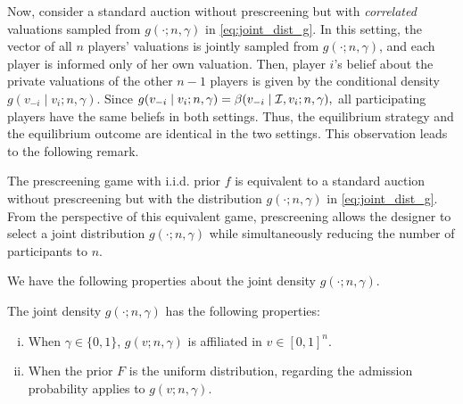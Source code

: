 Now, consider a standard auction without prescreening but with \textit{correlated} valuations sampled from $g(\cdot;n,\gamma)$ in \eqref{eq:joint_dist_g}. In this setting, the vector of all $n$ players' valuations is jointly sampled from $g(\cdot;n,\gamma)$, and each player is informed only of her own valuation. Then, player $i$'s belief about the private valuations of the other $n-1$ players is given by the conditional density $g(v_{-i}\mid v_i;n,\gamma).$
Since $g(v_{-i}\mid v_i;n,\gamma)=\beta(v_{-i}\mid \mathcal{I},v_i;n,\gamma),$
all participating players have the same beliefs in both settings. Thus, the equilibrium strategy and the equilibrium outcome are identical in the two settings. This observation leads to the following remark.
\begin{remark}
The prescreening game with i.i.d. prior $f$ is equivalent to a standard auction without prescreening but with the {} distribution $g(\cdot;n,\gamma)$ in \eqref{eq:joint_dist_g}.
From the perspective of this equivalent game, prescreening allows the designer to select a joint distribution $g(\cdot;n,\gamma)$ while simultaneously reducing the number of participants to $n$.
\end{remark}




We have the following properties about the joint density $g(\cdot;n,\gamma)$.

\begin{proposition}
\label{prop:g_property}
The joint density $g(\cdot;n,\gamma)$ has the following properties:
\begin{enumerate}[(i)]
   
    \item When $\gamma\in \{0,1\}$, $g(v;n,\gamma)$ is affiliated in $v\in [0,1]^n$.
    \item When the prior $F$ is the uniform distribution,  regarding the admission probability applies to $g(v;n,\gamma)$.
\end{enumerate}
\end{proposition}


